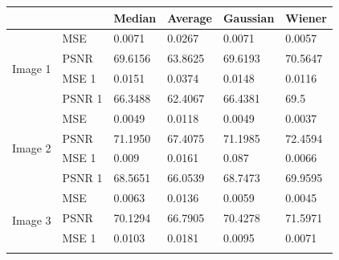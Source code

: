 \begin{center}
\begin{tabular}{|l|l|l|l|l|l|l|l|l|l|}
\hline
\multicolumn{2}{|l|}{}            & \multicolumn{2}{l|}{Median}  & \multicolumn{2}{l|}{Average} & \multicolumn{2}{l|}{Gaussian} & \multicolumn{2}{l|}{Wiener}  \\ \hline
\multirow{4}{*}{Image 1} & MSE    & \multicolumn{2}{l|}{0.0071}  & \multicolumn{2}{l|}{0.0267}  & \multicolumn{2}{l|}{0.0071}   & \multicolumn{2}{l|}{0.0057}  \\ \cline{2-10} 
                         & PSNR   & \multicolumn{2}{l|}{69.6156} & \multicolumn{2}{l|}{63.8625} & \multicolumn{2}{l|}{69.6193}  & \multicolumn{2}{l|}{70.5647} \\ \cline{2-10} 
                         & MSE 1  & \multicolumn{2}{l|}{0.0151}  & \multicolumn{2}{l|}{0.0374}  & \multicolumn{2}{l|}{0.0148}   & \multicolumn{2}{l|}{0.0116}  \\ \cline{2-10} 
                         & PSNR 1 & \multicolumn{2}{l|}{66.3488} & \multicolumn{2}{l|}{62.4067} & \multicolumn{2}{l|}{66.4381}  & \multicolumn{2}{l|}{69.5}    \\ \hline
\multirow{4}{*}{Image 2} & MSE    & \multicolumn{2}{l|}{0.0049}  & \multicolumn{2}{l|}{0.0118}  & \multicolumn{2}{l|}{0.0049}   & \multicolumn{2}{l|}{0.0037}  \\ \cline{2-10} 
                         & PSNR   & \multicolumn{2}{l|}{71.1950} & \multicolumn{2}{l|}{67.4075} & \multicolumn{2}{l|}{71.1985}  & \multicolumn{2}{l|}{72.4594} \\ \cline{2-10} 
                         & MSE 1  & \multicolumn{2}{l|}{0.009}   & \multicolumn{2}{l|}{0.0161}  & \multicolumn{2}{l|}{0.087}    & \multicolumn{2}{l|}{0.0066}  \\ \cline{2-10} 
                         & PSNR 1 & \multicolumn{2}{l|}{68.5651} & \multicolumn{2}{l|}{66.0539} & \multicolumn{2}{l|}{68.7473}  & \multicolumn{2}{l|}{69.9595} \\ \hline
\multirow{4}{*}{Image 3} & MSE    & \multicolumn{2}{l|}{0.0063}  & \multicolumn{2}{l|}{0.0136}  & \multicolumn{2}{l|}{0.0059}   & \multicolumn{2}{l|}{0.0045}  \\ \cline{2-10} 
                         & PSNR   & \multicolumn{2}{l|}{70.1294} & \multicolumn{2}{l|}{66.7905} & \multicolumn{2}{l|}{70.4278}  & \multicolumn{2}{l|}{71.5971} \\ \cline{2-10} 
                         & MSE 1  & \multicolumn{2}{l|}{0.0103}  & \multicolumn{2}{l|}{0.0181}  & \multicolumn{2}{l|}{0.0095}   & \multicolumn{2}{l|}{0.0071}  \\ \cline{2-10} 

\end{tabular}
\end{center}
